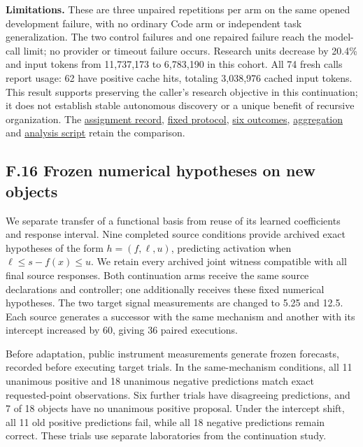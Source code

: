 \documentclass[11pt,a4paper]{article}
\begin{document}
\textbf{Limitations.} These are three unpaired repetitions per arm on the same opened development failure, with no ordinary Code arm or independent task generalization. The two control failures and one repaired failure reach the model-call limit; no provider or timeout failure occurs. Research units decrease by 20.4\% and input tokens from 11,737,173 to 6,783,190 in this cohort. All 74 fresh calls report usage: 62 have positive cache hits, totaling 3,038,976 cached input tokens. This result supports preserving the caller's research objective in this continuation; it does not establish stable autonomous discovery or a unique benefit of recursive organization. The \hyperlink{artifact-131}{assignment record}, \hyperlink{artifact-132}{fixed protocol}, \hyperlink{artifact-133}{six outcomes}, \hyperlink{artifact-134}{aggregation} and \hyperlink{artifact-135}{analysis script} retain the comparison.


\subsection*{F.16 Frozen numerical hypotheses on new objects}

We separate transfer of a functional basis from reuse of its learned coefficients and response interval. Nine completed source conditions provide archived exact hypotheses of the form \(h=(f,\ell,u)\), predicting activation when \(\ell\leq s-f(x)\leq u\). We retain every archived joint witness compatible with all final source responses. Both continuation arms receive the same source declarations and controller; one additionally receives these fixed numerical hypotheses. The two target signal measurements are changed to 5.25 and 12.5. Each source generates a successor with the same mechanism and another with its intercept increased by 60, giving 36 paired executions.


Before adaptation, public instrument measurements generate frozen forecasts, recorded before executing target trials. In the same-mechanism conditions, all 11 unanimous positive and 18 unanimous negative predictions match exact requested-point observations. Six further trials have disagreeing predictions, and 7 of 18 objects have no unanimous positive proposal. Under the intercept shift, all 11 old positive predictions fail, while all 18 negative predictions remain correct. These trials use separate laboratories from the continuation study.
\end{document}
